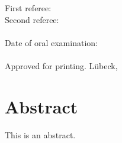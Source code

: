 \documentclass[
  11pt,
  a4paper,
  twoside,
  headsepline,
  titlepage,
  parskip=off
  DIV=11,
  BCOR=12mm,
  captions=tableheading,
  chapterprefix=on,
  numbers=noenddot
]{scrbook}
\begin{document}
\thispagestyle{headings}
\begin{titlepage}

\end{titlepage}

\begin{titlepage}
\addtolength{\topmargin}{18cm}
\noindent First referee:\\
Second referee:\\\\
Date of oral examination:\\\\
Approved for printing. Lübeck,
\end{titlepage}

\chapter*{Abstract}
\enlargethispage{1\baselineskip}
\setcounter{page}{1}
This is an abstract.
\end{document}

